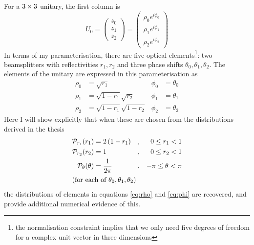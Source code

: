 \documentclass[a4paper,11pt]{article}
\begin{document}
For a \(3 \times 3\) unitary, the first column is
\begin{equation}
  U_{0} = \begin{pmatrix}
    z_{0} \\ z_{1} \\ z_{2}
  \end{pmatrix} = \begin{pmatrix}
    \rho_{0} e^{i \phi_{0}} \\
    \rho_{1} e^{i \phi_{1}} \\
    \rho_{2} e^{i \phi_{2}}
  \end{pmatrix}
\end{equation}
In terms of my parameterisation, there are five optical elements\footnote{the
normalisation constraint implies that we only need five degrees of freedom for a
complex unit vector in three dimensions}: two beamsplitters with reflectivities
\(r_{1}, r_{2}\) and three phase shifts \(\theta_{0}, \theta_{1}, \theta_{2}\).
The elements of the unitary are expressed in this parameterisation as
\begin{align}
  \rho_{0} &= \sqrt{r_{1}} & \phi_{0} &= \theta_{0} \\
  \rho_{1} &= \sqrt{1-r_{1}} \sqrt{r_{2}} & \phi_{1} &= \theta_{1} \\
  \rho_{2} &= \sqrt{1-r_{1}} \sqrt{1-r_{2}} & \phi_{2} &= \theta_{2}
\end{align}
Here I will show explicitly that when these are chosen from the distributions
derived in the thesis
\begin{align}
  \mathcal{P}_{r_{1}} \!\left(r_{1}\right) &= 2 \left( 1-r_{1} \right) &,
    && 0 \leq r_{1} < 1 \\
  \mathcal{P}_{r_{2}} \!\left(r_{2}\right) &= 1 &,
    && 0 \leq r_{2} < 1 \\
  \label{eq:theta}
  \mathcal{P}_{\theta} \!\left(\theta\right) &= \frac{1}{2 \pi} &,
    && -\pi \leq \theta < \pi \\
  \intertext{(for each of \(\theta_{0}, \theta_{1}, \theta_{2}\))}
\end{align}
the distributions of elements in equations \ref{eq:rho} and \ref{eq:phi} are
recovered, and provide additional numerical evidence of this.
\end{document}
